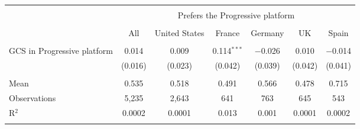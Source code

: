 
\begin{tabular}{@{\extracolsep{5pt}}lcccccc} 
\\[-1.8ex]\hline 
\hline \\[-1.8ex] 
 & \multicolumn{6}{c}{Prefers the Progressive platform} \\ 
\cline{2-7} 
\\[-1.8ex] & All & United States & France & Germany & UK & Spain \\ 
\hline \\[-1.8ex] 
 GCS in Progressive platform & 0.014 & 0.009 & 0.114$^{***}$ & $-$0.026 & 0.010 & $-$0.014 \\ 
  & (0.016) & (0.023) & (0.042) & (0.039) & (0.042) & (0.041) \\ 
 \hline \\[-1.8ex] 
Mean & 0.535 & 0.518 & 0.491 & 0.566 & 0.478 & 0.715 \\ 
Observations & 5,235 & 2,643 & 641 & 763 & 645 & 543 \\ 
R$^{2}$ & 0.0002 & 0.0001 & 0.013 & 0.001 & 0.0001 & 0.0002 \\ 
\hline 
\hline \\[-1.8ex] 
\end{tabular} 
